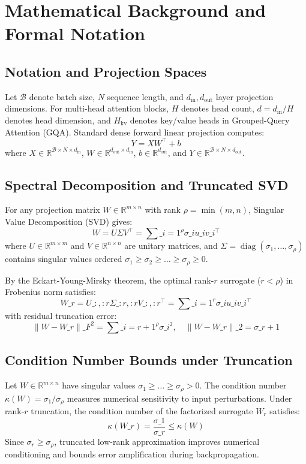 \section{Mathematical Background and Formal Notation}

\subsection{Notation and Projection Spaces}
Let $\mathcal{B}$ denote batch size, $N$ sequence length, and $d_{\text{in}}, d_{\text{out}}$ layer projection dimensions. For multi-head attention blocks, $H$ denotes head count, $d = d_{\text{in}} / H$ denotes head dimension, and $H_{\text{kv}}$ denotes key/value heads in Grouped-Query Attention (GQA).
Standard dense forward linear projection computes:
\[
Y = X W^\top + b
\]
where $X \in \mathbb{R}^{\mathcal{B} \times N \times d_{\text{in}}}$, $W \in \mathbb{R}^{d_{\text{out}} \times d_{\text{in}}}$, $b \in \mathbb{R}^{d_{\text{out}}}$, and $Y \in \mathbb{R}^{\mathcal{B} \times N \times d_{\text{out}}}$.

\subsection{Spectral Decomposition and Truncated SVD}
For any projection matrix $W \in \mathbb{R}^{m \times n}$ with rank $\rho = \min(m, n)$, Singular Value Decomposition (SVD) gives:
\[
W = U \Sigma V^\top = \sum\_{i=1}^{\rho} \sigma\_i u\_i v\_i^\top
\]
where $U \in \mathbb{R}^{m \times m}$ and $V \in \mathbb{R}^{n \times n}$ are unitary matrices, and $\Sigma = \operatorname{diag}(\sigma_1, \dots, \sigma_\rho)$ contains singular values ordered $\sigma_1 \ge \sigma_2 \ge \dots \ge \sigma_\rho \ge 0$.

By the Eckart-Young-Mirsky theorem, the optimal rank-$r$ surrogate ($r < \rho$) in Frobenius norm satisfies:
\[
W\_r = U\_{:, :r} \Sigma\_{:r, :r} V\_{:, :r}^\top = \sum\_{i=1}^{r} \sigma\_i u\_i v\_i^\top
\]
with residual truncation error:
\[
\|W - W\_r\|\_F^2 = \sum\_{i=r+1}^{\rho} \sigma\_i^2, \quad \|W - W\_r\|\_2 = \sigma\_{r+1}
\]

\subsection{Condition Number Bounds under Truncation}
Let $W \in \mathbb{R}^{m \times n}$ have singular values $\sigma_1 \ge \dots \ge \sigma_\rho > 0$. The condition number $\kappa(W) = \sigma_1 / \sigma_\rho$ measures numerical sensitivity to input perturbations. Under rank-$r$ truncation, the condition number of the factorized surrogate $W_r$ satisfies:
\[
\kappa(W\_r) = \frac{\sigma\_1}{\sigma\_r} \le \kappa(W)
\]
Since $\sigma_r \ge \sigma_\rho$, truncated low-rank approximation improves numerical conditioning and bounds error amplification during backpropagation.

